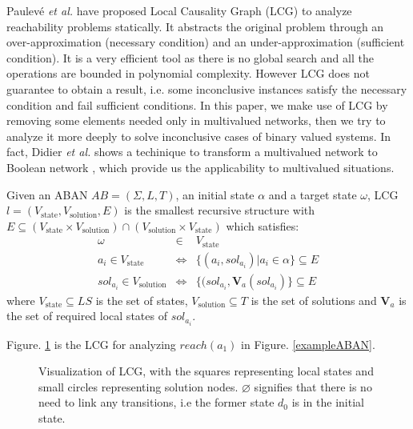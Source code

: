 \documentclass{entcs}
\begin{document}
Paulev\'e \textit{et al.} \cite{pauleve2011} have proposed Local Causality Graph (LCG) to analyze reachability problems statically.
It abstracts the original problem through an over-approximation (necessary condition) and an under-approximation (sufficient condition).
It is a very efficient tool as there is no global search and all the operations are bounded in polynomial complexity.
However LCG does not guarantee to obtain a result, i.e. some inconclusive instances satisfy the necessary condition and fail sufficient conditions.
In this paper, we make use of LCG by removing some elements needed only in multivalued networks, then we try to analyze it more deeply to solve inconclusive cases of binary valued systems.
In fact, Didier \textit{et al.} shows a techinique to transform a multivalued network to Boolean network \cite{didier2011mapping}, which provide us the applicability to multivalued situations.
\begin{definition}[LCG]\label{defLCG}
Given an ABAN $AB = (\Sigma,L,T)$, an initial state $\alpha$ and a target state $\omega$, LCG $l= (V_{\mathrm{state}},V_{\mathrm{solution}},E)$ is the smallest recursive structure with $E \subseteq (V_{\mathrm{state}}\times V_{\mathrm{solution}})\cap (V_{\mathrm{solution}}\times V_{\mathrm{state}})$ which satisfies:
\begin{eqnarray*}
    \omega&\in& V_{\mathrm{state}} \\
    a_i\in V_{\mathrm{state}} &\Leftrightarrow& \{ (a_i, sol_{a_i})| a_i\in \alpha\}\subseteq E \\
    sol_{a_i}\in V_{\mathrm{solution}}&\Leftrightarrow& \{ (sol_{a_i},\mathbf{V}_a (sol_{a_i})\}\subseteq E
\end{eqnarray*}
where $V_{\mathrm{state}}\subseteq LS$ is the set of states, $V_{\mathrm{solution}}\subseteq T$ is the set of solutions and $\mathbf{V}_a$ is the set of required local states of $sol_{a_i}$.
\end{definition}
\begin{example}
    Figure. \ref{LCGexample} is the LCG for analyzing $reach(a_1)$ in Figure. \ref{exampleABAN}.
    \begin{figure}[ht]
        \centering
        
        \caption{Visualization of LCG, with the squares representing local states and small circles representing solution nodes.
        $\varnothing$ signifies that there is no need to link any transitions, i.e the former state $d_0$ is in the initial state.}
        \label{LCGexample}
    \end{figure}
\end{example}
\end{document}
